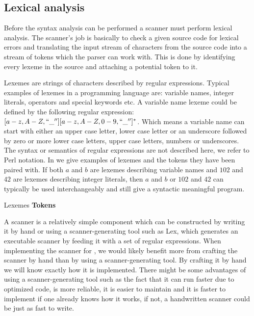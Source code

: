 \subsection{Lexical analysis}
\label{sec:lexicalanalysis}
Before the syntax analysis can be performed a scanner must perform lexical
analysis. The scanner's job is basically to check a given source code for
lexical errors and translating the input stream of characters from the source
code into a stream of tokens which the parser can work with. This is done by
identifying every lexeme in the source and attaching a potential token to
it\cite[p. 57]{fischer2009}.

Lexemes are strings of characters described by regular expressions.  Typical
examples of lexemes in a programming language are: variable names, integer
literals, operators and special keywords etc. A variable name lexeme could be
defined by the following regular expression: $[a-z, A-Z, ``\_''][a-z, A-Z, 0-9,
``\_'']^*$. Which means a variable name can start with either an upper case
letter, lower case letter or an underscore followed by zero or more lower case
letters, upper case letters, numbers or underscores. The syntax or semantics of
regular expressions are not described here, we refer to Perl
notation\cite{perlRegex}. In  we give examples of
lexemes and the tokens they have been paired with. If both $a$ and
$b$ are lexemes describing variable names and $102$ and
$42$ are lexemes describing integer literals, then $a$ and
$b$ or $102$ and $42$ can typically be used interchangeably
and still give a syntactic meaningful program.

		             {               }
       {Lexemes             }{\textbf{Tokens} } {
}

A scanner is a relatively simple component which can be constructed by writing
it by hand or using a scanner-generating tool such as Lex, which generates an
executable scanner by feeding it with a set of regular expressions. When
implementing the scanner for \productname{}, we would likely benefit more from
crafting the scanner by hand than by using a scanner-generating tool. By
crafting it by hand we will know exactly how it is implemented. There might be
some advantages of using a scanner-generating tool such as the fact that it can
run faster due to optimized code, is more reliable, it is easier to maintain and
it is faster to implement if one already knows how it works, if not, a
handwritten scanner could be just as fast to write.
